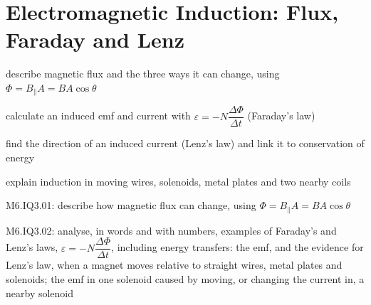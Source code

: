 \chapter{Electromagnetic Induction: Flux, Faraday and Lenz}\label{ch3:chap}
\newcommand\chThreeACW[3]{%
  \draw[line width=1.2pt, hscink] ($(#1,#2)+(110:#3)$) arc (110:400:#3);
  \draw[line width=1.2pt, hscink, -{Latex[length=2.4mm, width=2.0mm]}]
    ($(#1,#2)+(40:#3)+(310:0.05)$) -- ($(#1,#2)+(40:#3)+(130:0.19)$);}
\newcommand\chThreeCW[3]{%
  \draw[line width=1.2pt, hscink] ($(#1,#2)+(70:#3)$) arc (70:-220:#3);
  \draw[line width=1.2pt, hscink, -{Latex[length=2.4mm, width=2.0mm]}]
    ($(#1,#2)+(140:#3)+(230:0.05)$) -- ($(#1,#2)+(140:#3)+(50:0.19)$);}


\begin{goals}
  \item describe magnetic flux and the three ways it can change, using
        $\Phi = B_\parallel A = BA\cos\theta$
  \item calculate an induced emf and current with
        $\varepsilon = -N\dfrac{\Delta\Phi}{\Delta t}$ (Faraday's law)
  \item find the direction of an induced current (Lenz's law) and link it to
        conservation of energy
  \item explain induction in moving wires, solenoids, metal plates and two
        nearby coils
\end{goals}

\begin{syllabus}
  \item M6.IQ3.01: describe how magnetic flux can change, using
        $\Phi = B_\parallel A = BA\cos\theta$
  \item M6.IQ3.02: analyse, in words and with numbers, examples of Faraday's and
        Lenz's laws, $\varepsilon = -N\dfrac{\Delta\Phi}{\Delta t}$, including energy
        transfers: the emf, and the evidence for Lenz's law, when a magnet moves
        relative to straight wires, metal plates and solenoids; the emf in one
        solenoid caused by moving, or changing the current in, a nearby solenoid
\end{syllabus}

